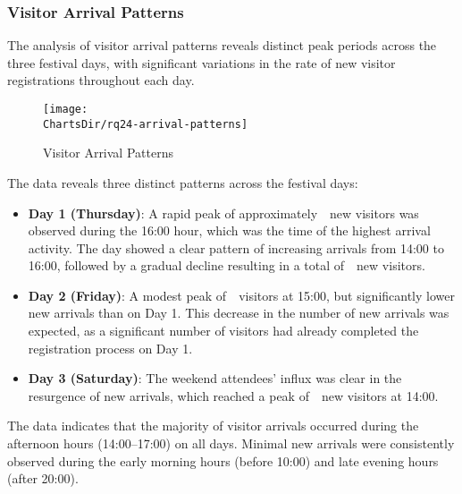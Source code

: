 
\subsubsection{Visitor Arrival Patterns}
\label{subsubsec:analysis-visitor-patterns}


The analysis of visitor arrival patterns reveals distinct peak periods across the three festival days, with significant variations in the rate of new visitor registrations throughout each day.

\begin{figure}[H]
	\centering
	\texttt{[image: \\ChartsDir/rq24-arrival-patterns]}
	\caption{ Visitor Arrival Patterns}
	\label{fig:visitor-arrival-patterns}
	\source
\end{figure}

The data reveals three distinct patterns across the festival days:

\begin{itemize}
	\item \textbf{Day 1 (Thursday)}: A rapid peak of approximately~~new visitors was observed during the 16:00 hour, which was the time of the highest arrival activity.
	The day showed a clear pattern of increasing arrivals from 14:00 to 16:00, followed by a gradual decline resulting in a total of~~new visitors.
	\item \textbf{Day 2 (Friday)}: A modest peak of~~visitors at 15:00, but significantly lower new arrivals than on Day 1.
	This decrease in the number of new arrivals was expected, as a significant number of visitors had already completed the registration process on Day 1.
	\item \textbf{Day 3 (Saturday)}: The weekend attendees' influx was clear in the resurgence of new arrivals, which reached a peak of~~new visitors at 14:00.
\end{itemize}

The data indicates that the majority of visitor arrivals occurred during the afternoon hours (14:00–17:00) on all days.
Minimal new arrivals were consistently observed during the early morning hours (before 10:00) and late evening hours (after 20:00).


